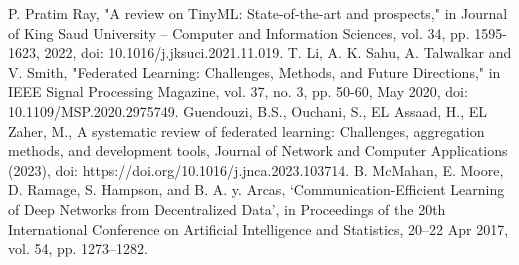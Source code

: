 \documentclass[conference]{IEEEtran}
\begin{document}
\begin{thebibliography}{00}
 P. Pratim Ray, "A review on TinyML: State-of-the-art and prospects," in Journal of King Saud University –
Computer and Information Sciences, vol. 34, pp. 1595-1623, 2022, doi: 10.1016/j.jksuci.2021.11.019.
 T. Li, A. K. Sahu, A. Talwalkar and V. Smith, "Federated Learning: Challenges, Methods, and Future Directions," in IEEE Signal Processing Magazine, vol. 37, no. 3, pp. 50-60, May 2020, doi: 10.1109/MSP.2020.2975749.
 Guendouzi, B.S., Ouchani, S., EL Assaad, H., EL Zaher, M., A systematic
review of federated learning: Challenges, aggregation methods, and development tools, Journal of
Network and Computer Applications (2023), doi: https://doi.org/10.1016/j.jnca.2023.103714.
 B. McMahan, E. Moore, D. Ramage, S. Hampson, and B. A. y. Arcas, ‘Communication-Efficient Learning of Deep Networks from Decentralized Data’, in Proceedings of the 20th International Conference on Artificial Intelligence and Statistics, 20--22 Apr 2017, vol. 54, pp. 1273–1282.
\end{thebibliography}
\vspace{12pt}
\end{document}
